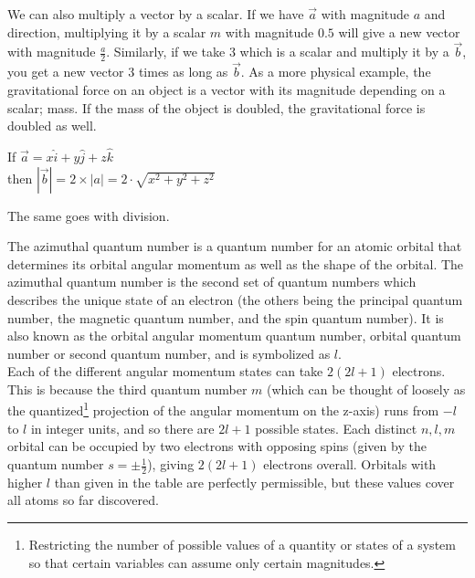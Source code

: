 \begin{phybox}{}
{We can also multiply a vector by a scalar. If we have $\Vec{a}$ with magnitude $a$ and direction, multiplying it by a scalar $m$ with magnitude $0.5$ will give a new vector with magnitude $\frac{a}{2}$. Similarly, if we take 3 which is a scalar and multiply it by a $\Vec{b}$, you get a new vector 3 times as long as $\Vec{b}$. As a more physical example, the gravitational force on an object is a vector with its magnitude depending on a scalar; mass. If the mass of the object is doubled, the gravitational force is doubled as well.
\begin{center}
    If $\Vec{a} = x \hat{i} + y \hat{j} + z \hat{k}$\\
    then $|\Vec{b}| = 2 \times |a| = 2 \cdot \sqrt{x^2 + y^2 + z^2}$
\end{center}
\begin{center}
\end{center}
The same goes with division.}
\end{phybox}
\begin{chembox}{}
{The azimuthal quantum number is a quantum number for an atomic orbital that determines its orbital angular momentum as well as the shape of the orbital. The azimuthal quantum number is the second set of quantum numbers which describes the unique state of an electron (the others being the principal quantum number, the magnetic quantum number, and the spin quantum number). It is also known as the orbital angular momentum quantum number, orbital quantum number or second quantum number, and is symbolized as $l$.\\
Each of the different angular momentum states can take $2(2l + 1)$ electrons. This is because the third quantum number $m$ (which can be thought of loosely as the quantized\footnote{Restricting the number of possible values of a quantity or states of a system so that certain variables can assume only certain magnitudes.} projection of the angular momentum on the z-axis) runs from $−l$ to $l$ in integer units, and so there are $2l + 1$ possible states. Each distinct $n, l, m$ orbital can be occupied by two electrons with opposing spins (given by the quantum number $s = \pm \frac{1}{2}$), giving $2(2l + 1)$ electrons overall. Orbitals with higher $l$ than given in the table are perfectly permissible, but these values cover all atoms so far discovered.}
\end{chembox}
